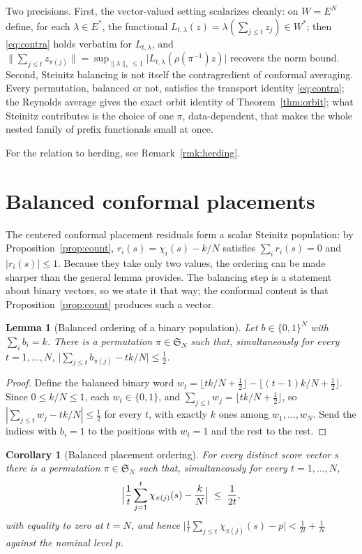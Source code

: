 \documentclass[11pt]{article}
\newtheorem{lemma}{Lemma}
\newtheorem{corollary}{Corollary}
\theoremstyle{remark}
\begin{document}
Two precisions. First, the vector-valued setting scalarizes cleanly: on $W=E^{N}$ define, for
each $\lambda\in E^{*}$, the functional $L_{t,\lambda}(z)=\lambda(\sum_{j\le t}z_j)\in W^{*}$;
then \eqref{eq:contra} holds verbatim for $L_{t,\lambda}$, and
$\|\sum_{j\le t}z_{\pi(j)}\|=\sup_{\|\lambda\|_{*}\le 1}\bigl|L_{t,\lambda}(\rho(\pi^{-1})z)\bigr|$
recovers the norm bound. Second, Steinitz balancing is not itself the contragredient of
conformal averaging. Every permutation, balanced or not, satisfies the transport identity
\eqref{eq:contra}; the Reynolds average gives the exact orbit identity of
Theorem~\ref{thm:orbit}; what Steinitz contributes is the choice of one $\pi$, data-dependent,
that makes the whole nested family of prefix functionals small at once.

For the relation to herding, see Remark~\ref{rmk:herding}.

\section{Balanced conformal placements}\label{sec:balanced}

The centered conformal placement residuals form a scalar Steinitz population: by
Proposition~\ref{prop:count}, $r_i(s)=\chi_i(s)-k/N$ satisfies $\sum_i r_i(s)=0$ and
$|r_i(s)|\le 1$. Because they take only two values, the ordering can be made sharper than the
general lemma provides. The balancing step is a statement about binary vectors, so we state it
that way; the conformal content is that Proposition~\ref{prop:count} produces such a vector.

\begin{lemma}[Balanced ordering of a binary population]\label{lem:binary}
Let $b\in\{0,1\}^{N}$ with $\sum_i b_i=k$. There is a permutation $\pi\in\mathfrak S_{N}$ such
that, simultaneously for every $t=1,\dots,N$,
$\bigl|\sum_{j\le t}b_{\pi(j)}-tk/N\bigr|\le\tfrac12$.
\end{lemma}

\begin{proof}
Define the balanced binary word
$w_t=\lfloor tk/N+\tfrac12\rfloor-\lfloor (t-1)k/N+\tfrac12\rfloor$. Since $0\le k/N\le 1$,
each $w_t\in\{0,1\}$, and $\sum_{j\le t}w_j=\lfloor tk/N+\tfrac12\rfloor$, so
$|\sum_{j\le t}w_j-tk/N|\le\tfrac12$ for every $t$, with exactly $k$ ones among
$w_1,\dots,w_N$. Send the indices with $b_i=1$ to the positions with $w_t=1$ and the rest to
the rest.
\end{proof}

\begin{corollary}[Balanced placement ordering]\label{prop:balanced}
For every distinct score vector $s$ there is a permutation $\pi\in\mathfrak S_{N}$ such that,
simultaneously for every $t=1,\dots,N$,
\[
\Bigl|\frac1t\sum_{j=1}^{t}\chi_{\pi(j)}(s)-\frac{k}{N}\Bigr|\;\le\;\frac{1}{2t},
\]
with equality to zero at $t=N$, and hence
$\bigl|\frac1t\sum_{j\le t}\chi_{\pi(j)}(s)-p\bigr|<\frac1{2t}+\frac1N$ against the nominal
level $p$.
\end{corollary}
\end{document}
